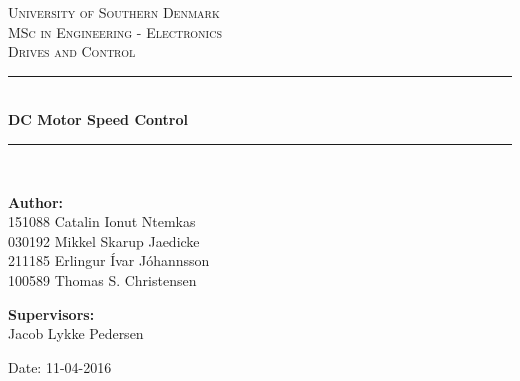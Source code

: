 \begin{titlepage}
\begin{center}

\textsc{\LARGE University of Southern Denmark}\\[1.5cm]
\textsc{\Large MSc in Engineering - Electronics}\\
\textsc{\large Drives and Control}\\[0.5cm]
\vfill
\hrule ~\\[0.3cm]
{ \huge \bfseries DC Motor Speed Control\\[0.4cm] }
\hrule ~\\[1.5cm]
\vfill

\begin{minipage}[t]{.49\textwidth}
\begin{flushleft} \large
\textbf{Author:}\\
151088 Catalin Ionut Ntemkas\\
030192 Mikkel Skarup Jaedicke\\
211185 Erlingur Ívar Jóhannsson\\
100589 Thomas S. Christensen
\end{flushleft}
\end{minipage}
\begin{minipage}[t]{.49\textwidth}
\begin{flushright} \large
\textbf{Supervisors:} \\
Jacob Lykke Pedersen\\
\end{flushright}
\end{minipage}

\vspace{1.2cm}
Date: 11-04-2016

\end{center}
\end{titlepage}